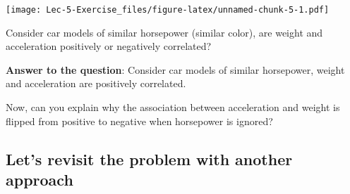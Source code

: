 \documentclass[
]{article}
\newenvironment{Shaded}{\begin{snugshade}}{\end{snugshade}}
\newcommand{\AttributeTok}[1]{\textcolor[rgb]{0.13,0.29,0.53}{#1}}
\newcommand{\DecValTok}[1]{\textcolor[rgb]{0.00,0.00,0.81}{#1}}
\newcommand{\FunctionTok}[1]{\textcolor[rgb]{0.13,0.29,0.53}{\textbf{#1}}}
\newcommand{\NormalTok}[1]{#1}
\newcommand{\OtherTok}[1]{\textcolor[rgb]{0.56,0.35,0.01}{#1}}
\newcommand{\SpecialCharTok}[1]{\textcolor[rgb]{0.81,0.36,0.00}{\textbf{#1}}}
\newcommand{\StringTok}[1]{\textcolor[rgb]{0.31,0.60,0.02}{#1}}
\begin{document}
\begin{Shaded}
\end{Shaded}

\texttt{[image: Lec-5-Exercise\_files/figure-latex/unnamed-chunk-5-1.pdf]}

Consider car models of similar horsepower (similar color), are weight
and acceleration positively or negatively correlated?

\textbf{Answer to the question}: Consider car models of similar
horsepower, weight and acceleration are positively correlated.

Now, can you explain why the association between acceleration and weight
is flipped from positive to negative when horsepower is ignored?

\hypertarget{lets-revisit-the-problem-with-another-approach}{%
\subsection{Let's revisit the problem with another
approach}\label{lets-revisit-the-problem-with-another-approach}}
\end{document}
